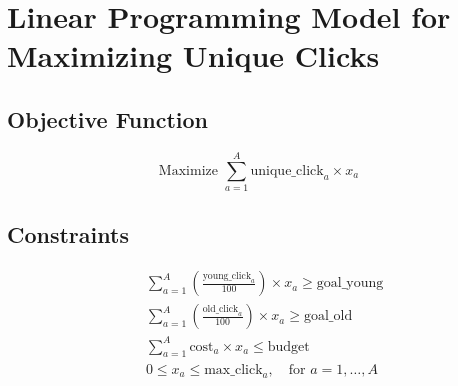 \documentclass{article}
\begin{document}
\section*{Linear Programming Model for Maximizing Unique Clicks}

\subsection*{Objective Function}
\[
\text{Maximize } \sum_{a=1}^{A} \text{unique\_click}_{a} \times x_a
\]

\subsection*{Constraints}

\begin{align*}
& \sum_{a=1}^{A} \left(\frac{\text{young\_click}_{a}}{100}\right) \times x_a \geq \text{goal\_young} \\
& \sum_{a=1}^{A} \left(\frac{\text{old\_click}_{a}}{100}\right) \times x_a \geq \text{goal\_old} \\
& \sum_{a=1}^{A} \text{cost}_{a} \times x_a \leq \text{budget} \\
& 0 \leq x_a \leq \text{max\_click}_{a}, \quad \text{for } a = 1, \ldots, A
\end{align*}
\end{document}
